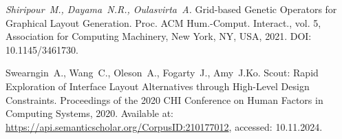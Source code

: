 \choicelang{ \newpage }{}

{\em Shiripour~M., Dayama~N.R., Oulasvirta~A.} Grid-based Genetic Operators for Graphical Layout Generation. Proc. ACM Hum.-Comput. Interact., vol. 5, Association for Computing Machinery, New York, NY, USA, 2021. DOI: 10.1145/3461730.

{\em }Swearngin~A., Wang~C., Oleson~A., Fogarty~J., Amy~J.Ko. Scout: Rapid Exploration of Interface Layout Alternatives through High-Level Design Constraints. Proceedings of the 2020 CHI Conference on Human Factors in Computing Systems, 2020. Available at: \url{https://api.semanticscholar.org/CorpusID:210177012}, accessed: 10.11.2024.
